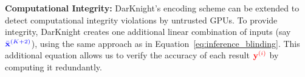 \textbf{Computational Integrity:}
DarKnight's encoding scheme can be extended to detect computational integrity violations by untrusted GPUs. %
To provide integrity, DarKnight creates one additional linear combination of inputs (say ${\color{blue}\bar{\mathbf x}^{(K+2)}}$), using the same approach as in Equation~\eqref{eq:inference_blinding}. This additional equation allows us to verify the accuracy of each result ${\color{red}{\mathbf y}^{(i)}}$ by computing it redundantly. %
